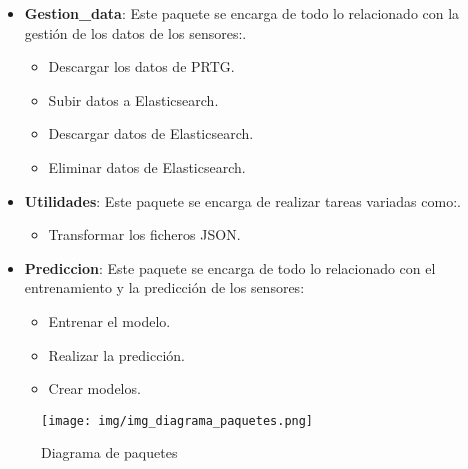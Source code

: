\begin{itemize}
    \item \textbf{Gestion\_data}: Este paquete se encarga de todo lo relacionado con la gestión de los datos de los sensores:. 
    \begin{itemize}
        \item Descargar los datos de PRTG.
        \item Subir datos a Elasticsearch.
        \item Descargar datos de Elasticsearch.
        \item Eliminar datos de Elasticsearch.
    \end{itemize}
    
    \item \textbf{Utilidades}: Este paquete se encarga de realizar tareas variadas como:.
        \begin{itemize}
            \item Transformar los ficheros JSON.
        \end{itemize}
    \item \textbf{Prediccion}: Este paquete se encarga de todo lo relacionado con el entrenamiento y la predicción de los sensores:
        \begin{itemize}
            \item Entrenar el modelo.
            \item Realizar la predicción.
            \item Crear modelos.
        \end{itemize}
\end{itemize}

\begin{figure}[h]
	\centering
	\texttt{[image: img/img\_diagrama\_paquetes.png]}
	\caption{Diagrama de paquetes}
	\label{img_diagrama_paquetes}
\end{figure}